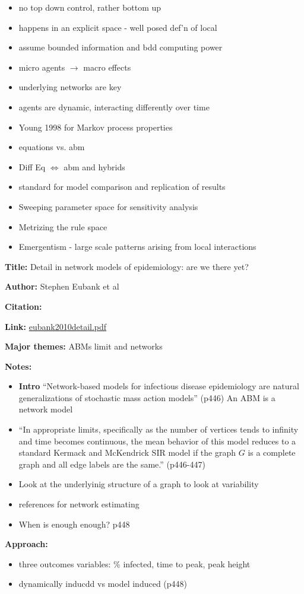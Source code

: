 \message{ !name(refs.tex)}\documentclass{article}
\begin{document}
\begin{itemize}
\item no top down control, rather bottom up
\item happens in an explicit space - well posed def'n of local
\item assume bounded information and bdd computing power
\item micro agents $\rightarrow$ macro effects
\item underlying networks are key
\item agents are dynamic, interacting differently over time
\item Young 1998 for Markov process properties
\item equations vs. abm
\item Diff Eq $\iff$ abm and hybrids
\item standard for model comparison and replication of results
\item Sweeping parameter space for sensitivity analysis
\item Metrizing the rule space
\item Emergentism - large scale patterns arising from local interactions
\end{itemize}



\textbf{Title:}  Detail in network models of epidemiology: are we there yet?

\textbf{Author:}  Stephen Eubank et al

\textbf{Citation:}\cite{eubank2010detail}

\textbf{Link:} \url{eubank2010detail.pdf}

\textbf{Major themes:}  ABMs limit and networks

\textbf{Notes:}
\begin{itemize}
\item \textbf{Intro}  ``Network-based models for infectious disease epidemiology are natural generalizations of stochastic mass action models'' (p446)
An ABM is a network model
\item ``In appropriate limits, specifically as the number of vertices tends to infinity and time becomes continuous, the mean behavior of this model reduces to a standard Kermack and McKendrick SIR model if the graph $G$ is a complete graph and all edge labels are the same.''  (p446-447)
\item Look at the underlyinig structure of a graph to look at variability
\item references for network estimating
\item When is enough enough? p448
\end{itemize}
\textbf{Approach:}
\begin{itemize}
\item three outcomes variables:  \% infected, time to peak, peak height
\item dynamically inducdd vs model induced (p448)
\end{itemize}
\end{document}
